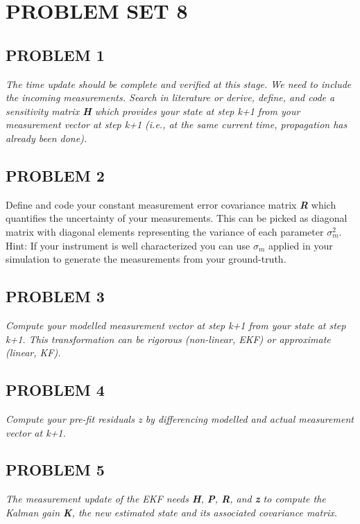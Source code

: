 \section{\Large PROBLEM SET 8}
\subsection{PROBLEM 1}
\textit{The time update should be complete and verified at this stage. We need to include the incoming measurements. Search in literature or derive, define, and code a sensitivity matrix \textbf{\textit{H}} which provides your state at step k+1 from your measurement vector at step k+1 (i.e., at the same current time, propagation has already been done).}

\subsection{PROBLEM 2}
Define and code your constant measurement error covariance matrix \textbf{\textit{R}} which quantifies the uncertainty of your measurements. This can be picked as diagonal matrix with diagonal elements representing the variance of each parameter $\sigma^{2}_{m}$. Hint: If your instrument is well characterized you can use $\sigma_{m}$ applied in your simulation to generate the measurements from your ground-truth.

\subsection{PROBLEM 3}
\textit{Compute your modelled measurement vector at step k+1 from your state at step k+1. This transformation can be rigorous (non-linear, EKF) or approximate (linear, KF).}

\subsection{PROBLEM 4}
\textit{Compute your pre-fit residuals \textit{z} by differencing modelled and actual measurement vector at k+1.}

\subsection{PROBLEM 5}
\textit{The measurement update of the EKF needs \textbf{\textit{H}}, \textbf{\textit{P}}, \textbf{\textit{R}}, and \textbf{\textit{z}} to compute the Kalman gain \textbf{\textit{K}}, the new estimated state and its associated covariance matrix.}

